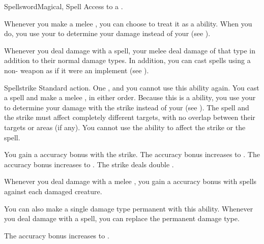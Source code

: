     \begin{magicalfeat}{Spellsword}{Magical, Spell}
        \featpre Access to a .

         Whenever you make a melee , you can choose to treat it as a \magical ability.
        When you do, you use your  to determine your damage instead of your  (see ).

         Whenever you deal damage with a spell, your melee   deal damage of that type in addition to their normal damage types.
        In addition, you can cast spells using a non- weapon as if it were an implement (see ).

        \begin{magicalactiveability}{Spellstrike}
            \abilityusagetime Standard action.
            \abilitycost One , and you  cannot use this ability again.
            \rankline
            You cast a spell and make a melee , in either order.
            Because this is a \magical ability, you use your  to determine your damage with the strike instead of your  (see ).
            The spell and the strike must affect completely different targets, with no overlap between their targets or areas (if any).
            You cannot use the  ability to affect the strike or the spell.

            \rankline
             You gain a  accuracy bonus with the strike.
             The accuracy bonus increases to .
             The accuracy bonus increases to .
             The strike deals double .
        \end{magicalactiveability}

         Whenever you deal damage with a melee , you  gain a  accuracy bonus with spells against each damaged creature.

         You can also make a single damage type permanent with this ability.
        Whenever you deal damage with a spell, you can replace the permanent damage type.

         The accuracy bonus increases to .
    \end{magicalfeat}

